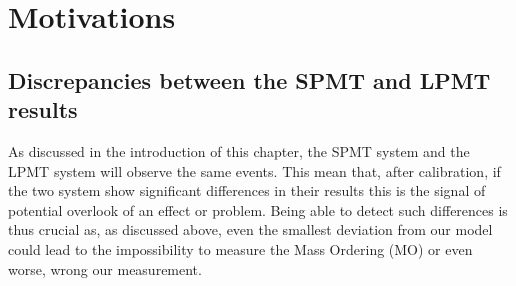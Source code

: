 \documentclass[../main.tex]{subfiles}
\begin{document}
\section{Motivations}
%
%
%
\subsection{Discrepancies between the SPMT and LPMT results}

As discussed in the introduction of this chapter, the SPMT system and the LPMT system will observe the same events. This mean that, after calibration, if the two system show significant differences in their results this is the signal of potential overlook of an effect or problem. Being able to detect such differences is thus crucial as, as discussed above, even the smallest deviation from our model could lead to the impossibility to measure the Mass Ordering (MO) or even worse, wrong our measurement.
\end{document}
